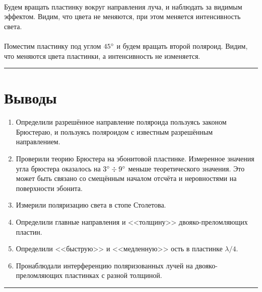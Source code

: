 \documentclass[a4paper,12pt]{article} %
\begin{document}
\paragraph{} Будем вращать пластинку вокруг направления луча, и наблюдать за видимым эффектом. Видим, что цвета не меняются, при этом меняется интенсивность света.

\paragraph{} Поместим пластинку под углом $45\degree$ и будем вращать второй поляроид. Видим, что меняются цвета пластинки, а интенсивность не изменяется.

\medskip\hrule\medskip

\section{Выводы}

\begin{enumerate}
\item Определили разрешённое направление поляроида пользуясь законом Брюстераю, и пользуясь поляроидом с известным разрешённым направлением.
\item Проверили теорию Брюстера на эбонитовой пластинке. Измеренное значения угла брюстера оказалось на $3\degree \div 9 \degree$ меньше теоретического значения. Это может быть связано со смещённым началом отсчёта и неровностями на поверхности эбонита.
\item Измерили поляризацию света в стопе Столетова.
\item Определили главные направления и <<толщину>> двояко-преломляющих пластин.\
\item Определили <<быструю>> и <<медленную>> ость в пластинке $\lambda/4$.
\item Пронаблюдали интерференцию поляризованных лучей на двояко-преломляющих пластинках с разной толщиной.
\end{enumerate}

\medskip\hrule\medskip
\end{document}
